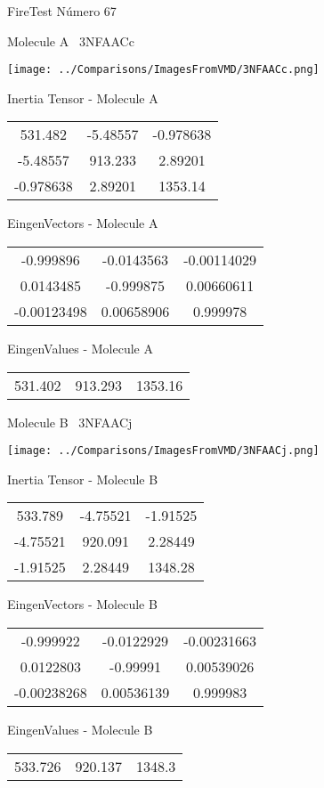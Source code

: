 \vtab[-3cm]
\begin{center}
{\large FireTest \tab Número 67}
\end{center}
\begin{multicols}{2}
\begin{center}

Molecule A \
3NFAACc

\texttt{[image: ../Comparisons/ImagesFromVMD/3NFAACc.png]}

Inertia Tensor - Molecule A \\
\begin{tabular}{|c c c|}
531.482	 & 	-5.48557	 & 	-0.978638	 \\
-5.48557	 & 	913.233	 & 	2.89201	 \\
-0.978638	 & 	2.89201	 & 	1353.14
\end{tabular}

\vtab
 EingenVectors - Molecule A     \\
\begin{tabular}{|c c c|}
-0.999896	 & 	-0.0143563	 & 	-0.00114029	 \\
0.0143485	 & 	-0.999875	 & 	0.00660611	 \\
-0.00123498	 & 	0.00658906	 & 	0.999978
\end{tabular}

\vtab
 EingenValues - Molecule A     \\
\begin{tabular}{|c c c|}
531.402	 & 	913.293	 & 	1353.16	 \\
\end{tabular}
\columnbreak

Molecule B \
3NFAACj

\texttt{[image: ../Comparisons/ImagesFromVMD/3NFAACj.png]}

Inertia Tensor - Molecule B \\
\begin{tabular}{|c c c|}
533.789	 & 	-4.75521	 & 	-1.91525	 \\
-4.75521	 & 	920.091	 & 	2.28449	 \\
-1.91525	 & 	2.28449	 & 	1348.28
\end{tabular}

\vtab
 EingenVectors - Molecule B     \\
\begin{tabular}{|c c c|}
-0.999922	 & 	-0.0122929	 & 	-0.00231663	 \\
0.0122803	 & 	-0.99991	 & 	0.00539026	 \\
-0.00238268	 & 	0.00536139	 & 	0.999983
\end{tabular}

\vtab
 EingenValues - Molecule B     \\
\begin{tabular}{|c c c|}
533.726	 & 	920.137	 & 	1348.3	 \\
\end{tabular}

\end{center}
\end{multicols}

